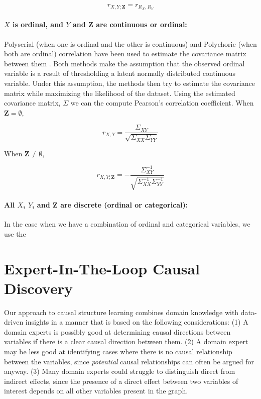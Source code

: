 \documentclass{uai2025} %
\begin{document}
\begin{equation}
	r_{X, Y; \bm{Z}} = r_{R_X, R_Y}
\end{equation}

\paragraph{$ X $ is ordinal, and $ Y $ and $ \bm{Z} $  are continuous or ordinal: }

Polyserial (when one is ordinal and the other is continuous) and Polychoric
(when both are ordinal) correlation have been used to estimate the covariance
matrix between them \citep{Poon1987}. Both methods make the assumption that the
observed ordinal variable is a result of thresholding a latent normally
distributed continuous variable. Under this assumption, the methods then try to
estimate the covariance matrix while maximizing the likelihood of the dataset.
Using the estimated covariance matrix, $ \Sigma $ we can the compute Pearson's
correlation coefficient. When $ \bm{Z} = \emptyset $,

\begin{equation}
	r_{X, Y} = \frac{\Sigma_{XY}}{\sqrt{\Sigma_{XX} \Sigma_{YY}}}
\end{equation}

When $ \bm{Z} \neq \emptyset $, 

\begin{equation}
	r_{X, Y; \bm{Z}} = - \frac{\Sigma^{-1}_{XY}}{\sqrt{\Sigma^{-1}_{XX} \Sigma^{-1}_{YY}}}
\end{equation}

\paragraph{All $ X $, $ Y $, and $ \bm{Z} $ are discrete (ordinal or categorical): }

In the case when we have a combination of ordinal and categorical variables, we use
the 



\section{Expert-In-The-Loop Causal Discovery}


Our approach to causal structure learning combines domain knowledge with data-driven
insights in a manner that is based on the following considerations: 
(1) A domain experts is possibly good at determining causal directions between variables if 
there is a clear causal direction between them. (2) A domain expert may be less good
at identifying cases where there is no causal relationship between the variables,
since \emph{potential} causal relationships can often be argued for anyway.
(3) Many domain experts could struggle to distinguish direct from indirect 
effects, since the presence of a direct effect between two variables
of interest depends on all other variables present in the graph. 
\end{document}
